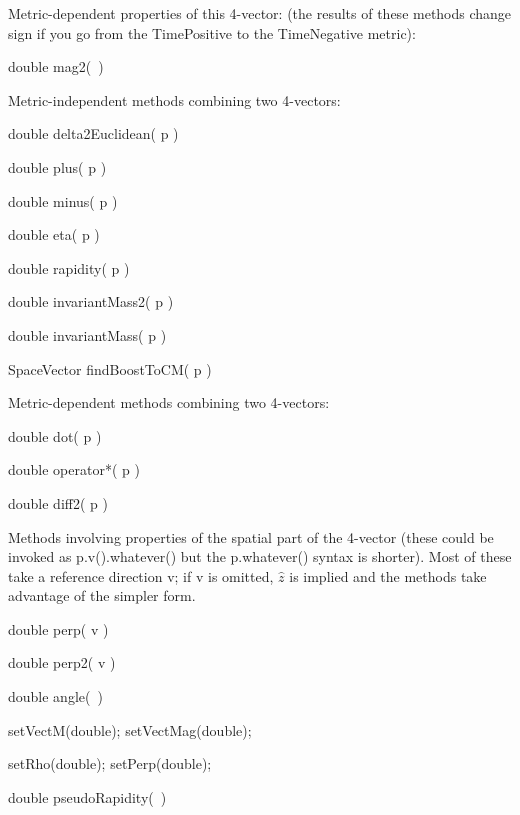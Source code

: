 \noindent
Metric-dependent properties of this 4-vector:
(the results of these methods change sign if you go from the
TimePositive to the TimeNegative metric):
\begin{shortlist}
  \item double mag2(~) \see{\ref{eq:wmag2}}
\end{shortlist}

\noindent
Metric-independent methods combining two 4-vectors:
\begin{shortlist}
  \item double delta2Euclidean( p ) \see{\ref{eq:wdelta2E}}
  \item double plus( p ) \see{\ref{eq:wplus:2}}
  \item double minus( p ) \see{\ref{eq:wminus:2}}
  \item double eta( p ) \see{\ref{eq:weta}, \ref{eq:weta:2}, \ref{eq:weta:3}, \ref{eq:weta:4}}
  \item double rapidity( p ) \see{\ref{eq:wrapid}, \ref{eq:wrapid:2}, \ref{eq:wrapid:3}, \ref{eq:wrapid:4}}  
  \item double invariantMass2( p ) \see{\ref{eq:winvMass2}}
  \item double invariantMass( p ) \see{\ref{eq:winvMass}}
  \item SpaceVector findBoostToCM( p ) \see{\ref{eq:wfindBoost}}
\end{shortlist}

\noindent
Metric-dependent methods combining two 4-vectors:
\begin{shortlist}
  \item double dot( p ) \see{\ref{eq:wdot}, \ref{eq:wdot:2}}
  \item double operator*( p ) \see{\ref{eq:wdot}, \ref{eq:wdot:2}}
  \item double diff2( p ) \see{\ref{eq:wdiff2}}
\end{shortlist}


\noindent 
Methods involving properties of the spatial part of the 4-vector
(these could be invoked as p.v().whatever() but the p.whatever()
syntax is shorter).  
Most of these take a reference direction v; if v is omitted,
$\hat{z}$ is implied and the methods take advantage of the simpler form.
\begin{shortlist}
  \item double perp( v ) \see{\ref{eq:perp}}
  \item double perp2( v ) \see{\ref{eq:perp2}}
  \item double angle(~) \see{\ref{eq:angle}}
  \item setVectM(double); \/\/\/  setVectMag(double); 
						\see{\ref{eq:polar}}
  \item setRho(double); \/\/\/  setPerp(double); 
						\see{\ref{eq:cylindrical}}
  \item double pseudoRapidity(~) \see{\ref{eq:spherical}}
\end{shortlist}


